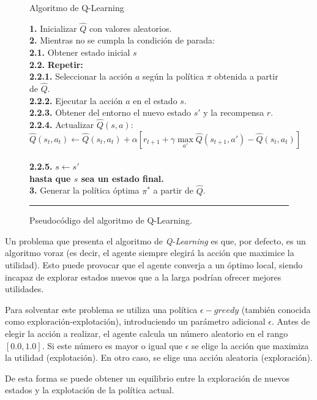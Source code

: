 \begin{figure}[h]
\begin{algorithm}[H]
\caption{Algoritmo de Q-Learning}
\textbf{1.} Inicializar $\hat{Q}$ con valores aleatorios.\\
\textbf{2.} Mientras no se cumpla la condición de parada:\\
\Indp \textbf{2.1.} Obtener estado inicial $s$\\
\textbf{2.2.} \textbf{Repetir:}\\
\Indp \textbf{2.2.1.} Seleccionar la acción $a$ según la política $\pi$ obtenida a partir de $\hat{Q}$.\\
\textbf{2.2.2.} Ejecutar la acción $a$ en el estado $s$.\\
\textbf{2.2.3.} Obtener del entorno el nuevo estado $s'$ y la recompensa $r$.\\
\textbf{2.2.4.} Actualizar $\hat{Q}(s,a)$:\\
\[\hat{Q}(s_t,a_t) \leftarrow \hat{Q}(s_t,a_t) + \alpha [r_{t+1} + \gamma \max_{a'} \hat{Q}(s_{t+1},a') - \hat{Q}(s_t,a_t)]\]\\
\textbf{2.2.5.} $s \leftarrow s'$\\
\Indm \textbf{hasta que $s$ sea un estado final.}\\
\Indm \textbf{3.} Generar la política óptima $\pi^{*}$ a partir de $\hat{Q}$.
\end{algorithm}
\hrule
\caption{Pseudocódigo del algoritmo de Q-Learning.}
\label{alg:chap3-qlearning}
\end{figure}

Un problema que presenta el algoritmo de \textit{Q-Learning} es que, por defecto, es un algoritmo voraz (es decir, el agente siempre elegirá la acción que maximice la utilidad). Esto puede provocar que el agente converja a un óptimo local, siendo incapaz de explorar estados nuevos que a la larga podrían ofrecer mejores utilidades.

Para solventar este problema se utiliza una política $\epsilon-greedy$ \cite{Sutton1998} (también conocida como exploración-explotación), introduciendo un parámetro adicional $\epsilon$. Antes de elegir la acción a realizar, el agente calcula un número aleatorio en el rango $[0.0, 1.0]$. Si este número es mayor o igual que $\epsilon$ se elige la acción que maximiza la utilidad (explotación). En otro caso, se elige una acción aleatoria (exploración). 

De esta forma se puede obtener un equilibrio entre la exploración de nuevos estados y la explotación de la política actual.


